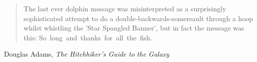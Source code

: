\thispagestyle{empty}
\begin{flushright}

\vspace*{60mm}

\begin{quote}
The last ever dolphin message was misinterpreted as a surprisingly sophisticated attempt to do a double-backwards-somersault through a hoop whilst whistling the 'Star Spangled Banner', but in fact the message was this: \mbox{So long and thanks for all the fish.}
\end{quote}
\vspace{4mm}
Douglas Adams, \textit{The Hitchhiker's Guide to the Galaxy}

\end{flushright}
